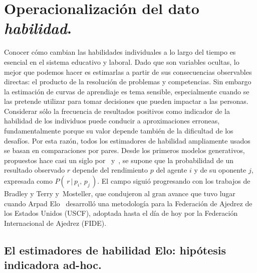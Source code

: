 \documentclass[a4paper,11pt]{book}
\theoremstyle{definition}
\begin{document}
\section{Operacionalizaci\'on del dato \emph{habilidad}.} \label{sec:operacionalizacion_habilidad}

Conocer c\'omo cambian las habilidades individuales a lo largo del tiempo es esencial en el sistema educativo y laboral.
%
Dado que son variables ocultas, lo mejor que podemos hacer es estimarlas a partir de sus consecuencias observables directas: el producto de la resoluci\'on de problemas y competencias.
%
Sin embargo la estimaci\'on de curvas de aprendiaje es tema sensible, especialmente cuando se las pretende utilizar para tomar decisiones que pueden impactar a las personas.
%
Considerar s\'olo la frecuencia de resultados positivos como indicador de la habilidad de los individuos puede conducir a aproximaciones erroneas, fundamentalmente porque su valor depende tambi\'en de la dificultad de los desaf\'ios.
%
Por esta raz\'on, todos los estimadores de habilidad ampliamente usados se basan en comparaciones por pares.
%
Desde los primeros modelos generativos, propuestos hace casi un siglo por~\cite{Thurstone1927} y~\cite{Zermelo1929}, se supone que la probabilidad de un resultado observado $r$ depende del rendimiento $p$ del agente $i$ y de su oponente $j$, expresada como $P(\, r \,|\, p_i, \, p_j \,)$.
%
El campo sigui\'o progresando con los trabajos de Bradley y Terry \cite{Bradley1952} y~\cite{Mosteller1951a,Mosteller1951b,Mosteller1951c}Mosteller, que condujeron al gran avance que tuvo lugar cuando Arpad Elo~\cite{Elo2008} desarroll\'o una metodolog\'ia para la Federaci\'on de Ajedrez de los Estados Unidos (USCF), adoptada hasta el d\'ia de hoy por la Federaci\'on Internacional de Ajedrez (FIDE).

\subsection{El estimadores de habilidad Elo: hip\'otesis indicadora ad-hoc.}
\end{document}
